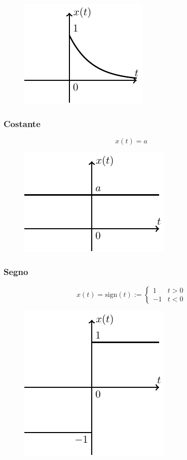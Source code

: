 \documentclass{article}
\numberwithin{equation}{subsection}
\begin{document}
\begin{figure}[H]%
    \centering
    \includegraphics{esponenziale-unilatero.pdf}%
\end{figure}

\subsubsection{Costante}

\begin{equation}
    x(t)=a
\end{equation}
\begin{figure}[H]%
    \centering
    \includegraphics{costante.pdf}%
\end{figure}

\subsubsection{Segno}

\begin{equation}
    x(t)=\mbox{sign}(t):=\begin{cases}
        1&t>0\\
        -1&t<0
    \end{cases}
\end{equation}

\begin{figure}[H]%
    \centering
    \includegraphics{segno.pdf}%
\end{figure}
\end{document}
